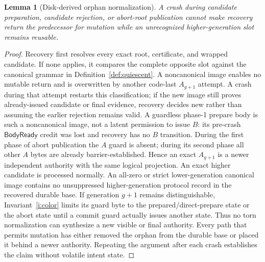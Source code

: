\documentclass[10pt,twocolumn]{article}
\newtheorem{lemma}{Lemma}
\theoremstyle{remark}
\begin{document}
\begin{lemma}[Disk-derived orphan normalization]\label{lem:normalize}
A crash during candidate preparation, candidate rejection, or abort-root publication cannot
make recovery return the predecessor for mutation while an unrecognized higher-generation slot
remains reusable.
\end{lemma}
\begin{proof}
Recovery first resolves every exact root, certificate, and wrapped candidate. If none applies, it
compares the complete opposite slot against the canonical grammar in
Definition~\ref{def:quiescent}. A noncanonical image enables no mutable return and is overwritten by
another code-last $A_{g+1}$ attempt. A crash during that attempt restarts this classification; if
the new image still proves already-issued candidate or final evidence, recovery decides new rather
than assuming the earlier rejection remains valid. A guardless phase-1 prepare body is such a noncanonical image, not
a latent permission to issue $B$: its pre-crash $\mathsf{BodyReady}$ credit was lost and recovery
has no $B$ transition. During the first phase of abort publication the $A$ guard is absent; during its
second phase all other $A$ bytes are already barrier-established. Hence an exact $A_{g+1}$ is a
newer independent authority with the
same logical projection. An exact higher candidate is processed normally. An all-zero or strict
lower-generation canonical image contains no unsuppressed higher-generation protocol record in the
recovered durable base. If generation $g+1$ remains distinguishable, Invariant~\ref{i:color}
limits its guard byte to the prepared/direct-prepare state or the abort state until a commit guard
actually issues another state. Thus no torn normalization can synthesize a new visible or final
authority. Every path that permits mutation has
either removed the orphan from the durable base or placed it behind a newer authority. Repeating
the argument after each crash establishes the claim without volatile intent state.
\end{proof}
\end{document}
